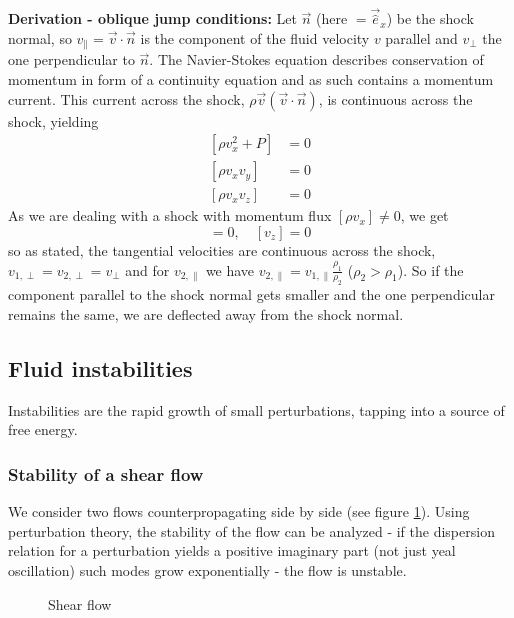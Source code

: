 \textbf{Derivation - oblique jump conditions:} Let $\vec{n}$ (here $=\vec{\hat{e}}_x$) be the shock normal, so $v_\parallel = \vec{v} \cdot \vec{n}$ is the component of the fluid velocity $v$ parallel and $v_\perp$ the one perpendicular to $\vec{n}$.
The Navier-Stokes equation describes conservation of momentum in form of a continuity equation and as such contains a momentum current.
This current across the shock, $\rho \vec{v} (\vec{v} \cdot \vec{n})$, is continuous across the shock, yielding
\begin{equation}
    \begin{aligned}
        [\rho v_x^2 + P] &= 0 \\
        [\rho v_x v_y] &= 0 \\
        [\rho v_x v_z] &= 0
    \end{aligned}
\end{equation}
As we are dealing with a shock with momentum flux $[\rho v_x] \ne 0$, we get
\begin{equation}
    [v_y] = 0, \quad [v_z] = 0
\end{equation}
so as stated, the tangential velocities are continuous across the shock, $v_{1,\perp} = v_{2,\perp} = v_\perp$ and
for $v_{2,\parallel}$ we have $v_{2,\parallel} = v_{1,\parallel} \frac{\rho_1}{\rho_2}$ ($\rho_2 > \rho_1$).
So if the component parallel to the shock normal gets smaller and the one perpendicular remains the same, we
are deflected away from the shock normal.

\subsection{Fluid instabilities}
Instabilities are the rapid growth of small perturbations, tapping into a source of free energy.

\subsubsection{Stability of a shear flow}
We consider two flows counterpropagating side by side (see figure \ref{fig:shear_flow}). Using perturbation theory, the stability
of the flow can be analyzed - if the dispersion relation for a perturbation yields a positive imaginary part (not just yeal oscillation)
such modes grow exponentially - the flow is unstable.

\begin{figure}[!htb]
    \centering
    
    \caption{Shear flow}
    \label{fig:shear_flow}
\end{figure}

